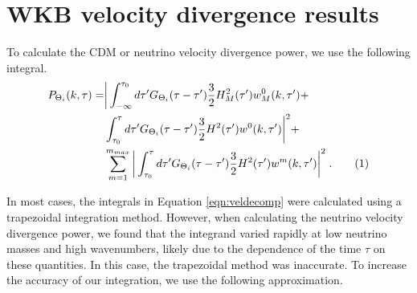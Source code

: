 \documentclass[superscriptaddress,prd]{revtex4}
\newcommand\numberthis{\addtocounter{equation}{1}\tag{\theequation}}
\begin{document}
\section{ WKB velocity divergence results }

To calculate the CDM or neutrino velocity divergence power, we use the following integral.
\begin{align*}\label{eqn:veldecomp}
  P_{\Theta_i}( k, \tau) =& \bigg| \int_{-\infty}^{\tau_0} d \tau'
                            G_{\Theta_i}(\tau-\tau') \frac{3}{2}
                            H_M^2(\tau') w_M^0(k,\tau')  +
  \\ &
  \int_{\tau_0}^\tau d\tau' G_{\Theta_i}(\tau-\tau') \frac{3}{2} H^2(\tau')
  w^0(k,\tau') \bigg|^2 +\\
& \sum_{m=1}^{m_{max}} \bigg| \int_{\tau_0}^\tau d \tau'
  G_{\Theta_i}(\tau-\tau') \frac{3}{2} H^2(\tau') w^m(k,\tau')
   \bigg|^2 \;. \numberthis
\end{align*}


In most cases, the integrals in Equation \ref{eqn:veldecomp}
were calculated using a trapezoidal integration method.
However, when calculating the
neutrino velocity divergence power, we found that the integrand varied
rapidly at low neutrino masses and high wavenumbers, likely due to the
dependence of the time $\tau$ on these quantities.  In this case, the
trapezoidal method was inaccurate.  To increase the
accuracy of our integration, we use the following approximation.
\end{document}
